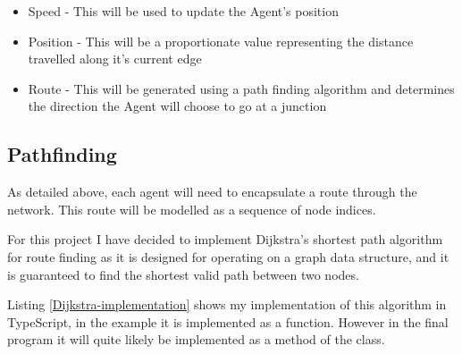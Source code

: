     \begin{itemize}
        \item Speed - This will be used to update the Agent's position
        \item Position - This will be a proportionate value representing the distance travelled along it's current edge
        \item Route - This will be generated using a path finding algorithm and determines the direction the Agent will choose to go at a junction
    \end{itemize}

    \subsection{Pathfinding}
    \label{design:pathfinding}

        As detailed above, each agent will need to encapsulate a route through the network. This route will be modelled as a sequence of node indices.

        For this project I have decided to implement Dijkstra's shortest path algorithm for route finding as it is designed for operating on a graph data structure, and it is guaranteed to find the shortest valid path between two nodes.

        Listing \ref{Dijkstra-implementation} shows my implementation of this algorithm in TypeScript, in the example it is implemented as a function. However in the final program it will quite likely be implemented as a method of the  class.


